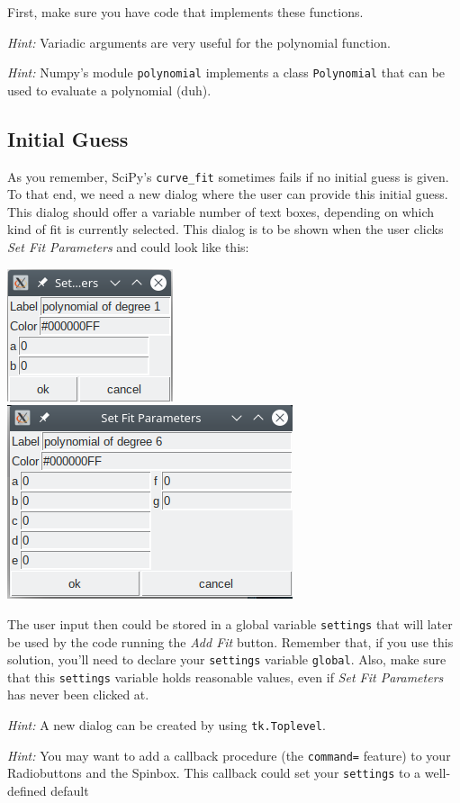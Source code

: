 \documentclass[
	english,
	fontsize=10pt,
	parskip=half,
	titlepage=true,
	DIV=12
]{scrartcl}
\newcommand*{\inPy}[1]{\texttt{#1}}
\begin{document}
First, make sure you have code that implements these functions.

\emph{Hint:} Variadic arguments are very useful for the polynomial function.

\emph{Hint:} Numpy's module \texttt{polynomial} implements a class \texttt{Polynomial} that can be used to evaluate a polynomial (duh).

\subsection{Initial Guess}
As you remember, SciPy's \texttt{curve\_fit} sometimes fails if no initial guess is given. To that end, we need a new dialog where the user can provide this initial guess. This dialog should offer a variable number of text boxes, depending on which kind of fit is currently selected. This dialog is to be shown when the user clicks \emph{Set Fit Parameters} and could look like this:
\begin{center}
	\includegraphics[width=.25\linewidth]{./tk-SetParams-a}
	\quad
	\includegraphics[width=.40\linewidth]{./tk-SetParams-b}
\end{center}

The user input then could be stored in a global variable \texttt{settings} that will later be used by the code running the \emph{Add Fit} button. Remember that, if you use this solution, you'll need to declare your \texttt{settings} variable \inPy{global}. Also, make sure that this \texttt{settings} variable holds reasonable values, even if \emph{Set Fit Parameters} has never been clicked at.

\emph{Hint:} A new dialog can be created by using \texttt{tk.Toplevel}.

\emph{Hint:} You may want to add a callback procedure (the \texttt{command=} feature) to your Radiobuttons and the Spinbox. This callback could set your \texttt{settings} to a well-defined default
\end{document}
